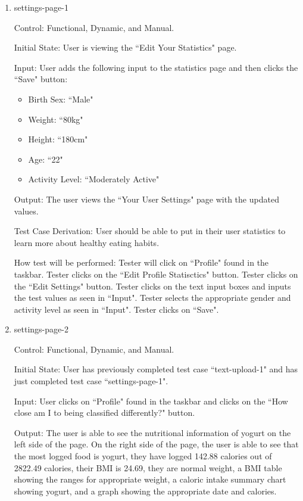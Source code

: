 \documentclass[12pt, titlepage]{article}
\begin{document}
	\begin{enumerate}
		\item{settings-page-1\\}
		
		Control: Functional, Dynamic, and Manual.
		
		Initial State: User is viewing the ``Edit Your Statistics" page.
		
		Input: User adds the following input to the statistics page and then clicks the ``Save" button:
		
		\begin{itemize}
			\item Birth Sex: ``Male"
			\item Weight: ``80kg"
			\item Height: ``180cm"
			\item Age: ``22"
			\item Activity Level: ``Moderately Active"
		\end{itemize}
		
		Output: The user views the ``Your User Settings" page with the updated values.
		
		Test Case Derivation: User should be able to put in their user statistics to learn more about healthy eating habits.
		
		How test will be performed: Tester will click on ``Profile" found in the taskbar. Tester clicks on the ``Edit Profile Statisctics" button. Tester clicks on the ``Edit Settings" button. Tester clicks on the text input boxes and inputs the test values as seen in ``Input". Tester selects the appropriate gender and activity level as seen in ``Input". Tester clicks on ``Save".
		
		\item{settings-page-2\\}
		
		Control: Functional, Dynamic, and Manual.
		
		Initial State: User has previously completed test case ``text-upload-1" and has just completed test case ``settings-page-1".
		
		Input: User clicks on ``Profile" found in the taskbar and clicks on the ``How close am I to being classified differently?" button.
		
		Output: The user is able to see the nutritional information of yogurt on the left side of the page. On the right side of the page, the user is able to see that the most logged food is yogurt, they have logged 142.88 calories out of 2822.49 calories, their BMI is 24.69, they are normal weight, a BMI table showing the ranges for appropriate weight, a caloric intake summary chart showing yogurt, and a graph showing the appropriate date and calories.
		

\end{enumerate}
\end{document}
